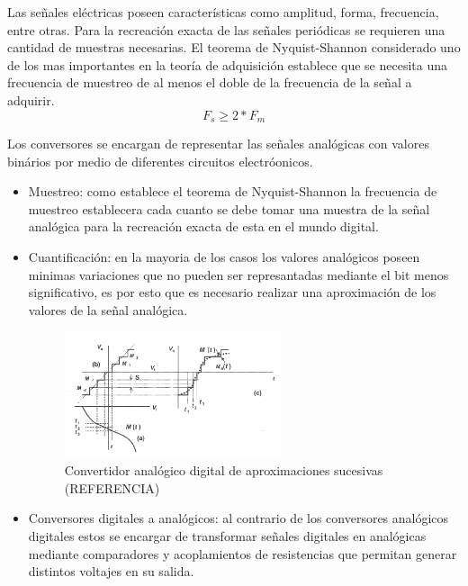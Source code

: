         \par Las señales eléctricas poseen características como amplitud, forma, frecuencia, entre otras. Para la recreación exacta de las señales periódicas se requieren una cantidad de muestras necesarias. El teorema de Nyquist-Shannon considerado uno de los mas importantes en la teoría de adquisición establece que se necesita una frecuencia de muestreo de al menos el doble de la frecuencia de la señal a adquirir.
        \begin{equation}
          F_s \geq 2*F_m
        \end{equation}
          \par Los conversores se encargan de representar las señales analógicas con valores binários por medio de diferentes circuitos electróonicos.
          \begin{itemize}
            \item Muestreo: como establece el teorema de Nyquist-Shannon la frecuencia de muestreo establecera cada cuanto se debe tomar una muestra de la señal analógica para la recreación exacta de esta en el mundo digital.
            \item Cuantificación: en la mayoria de los casos los valores analógicos poseen minimas variaciones que no pueden ser represantadas mediante el bit menos significativo, es por esto que es necesario realizar una aproximación de los valores de la señal analógica.
            \begin{figure}[H]
              \centering
              \includegraphics[width=0.6\textwidth]{../Imagenes/Cuantificacion.png}
              \caption{Convertidor analógico digital de aproximaciones sucesivas (REFERENCIA)}
              \label{fig:Cuantificacion}
            \end{figure}
            \item Conversores digitales a analógicos: al contrario de los conversores analógicos digitales estos se encargar de transformar señales digitales en analógicas mediante comparadores y acoplamientos de resistencias que permitan generar distintos voltajes en su salida.
          \end{itemize}

